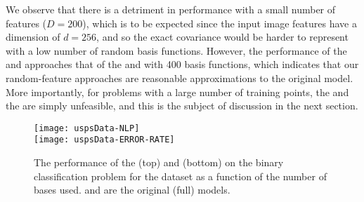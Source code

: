 We observe that there is a detriment in performance with a small 
number of features ($D=200$),  which is to be expected since the input image 
features have a dimension of $d = 256$, and so
the exact covariance would be harder to represent with a low number of random
basis functions. 
However, the performance of the
\eks and \uks approaches that of the \ugp and \egp with 400 basis functions,
which indicates that our random-feature approaches are reasonable approximations to
the original \gp model. More importantly, for problems with a large number of training 
points, the \egp and the \ugp are simply unfeasible, and this is the subject of discussion 
in the next section.
\begin{figure}[t]
\centering
\texttt{[image: uspsData-NLP]}  \\
\texttt{[image: uspsData-ERROR-RATE]}  
\caption{The performance of the \eks (top) and \uks (bottom) on the binary classification problem for the \usps dataset as a function of 
the number of  bases used. \egp and \ugp are the original (full) \gp models.
\label{fig:usps}
}
\end{figure}
%
 



 
